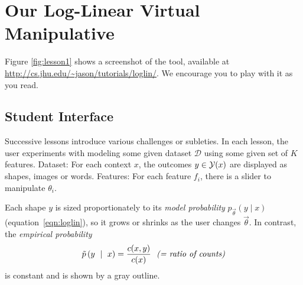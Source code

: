 \documentclass[11pt,letterpaper]{article}
\newcommand{\Note}[1]{}
\renewcommand{\Note}[1]{\hl{[#1]}}  %
\newcommand{\NoteSigned}[3]{{\sethlcolor{#2}\Note{#1: #3}}}
\newcommand{\NoteJE}[1]{\NoteSigned{JE}{LightGreen}{#1}}
\newcommand{\Commented}[1]{#1}
\newcommand{\empirical}[0]{\ensuremath{\tilde{p}}}
\newcommand{\Data}[0]{\ensuremath{\mathcal{D}}}
\newcommand{\WhereToFind}[0]{\url{http://cs.jhu.edu/~jason/tutorials/loglin/}}
\begin{document}

\section{Our Log-Linear Virtual Manipulative}\label{sec:overview}

Figure \ref{fig:lesson1} shows a screenshot
of the tool, available at 
\WhereToFind{}. We encourage you to play with it as you read.



\subsection{Student Interface}

Successive lessons introduce various challenges or subleties.  In each lesson, the user 
experiments with modeling some given dataset \Data{} using some
given set of $K$ features.  
Dataset: For each context $x$, the outcomes $y \in {\cal Y}(x)$ are
displayed as shapes, images or words.
Features: For each feature $f_i$, there is a slider to manipulate $\theta_i$.


Each shape $y$ is sized proportionately to its {\em model
probability} $p_{\vec{\theta}}(y \mid x)$ (equation~\eqref{eqn:loglin}), so it grows or shrinks as the user changes
$\vec{\theta}$.  
In contrast, the {\em empirical probability} 
\begin{equation}
\empirical\left(y\ \mid\ x\right) = \frac{c(x,y)}{c(x)} \ \ \text{\it (= ratio of counts)}
\label{eqn:empirical_distr}
\end{equation} 
is constant and is shown by a gray outline.
\end{document}
